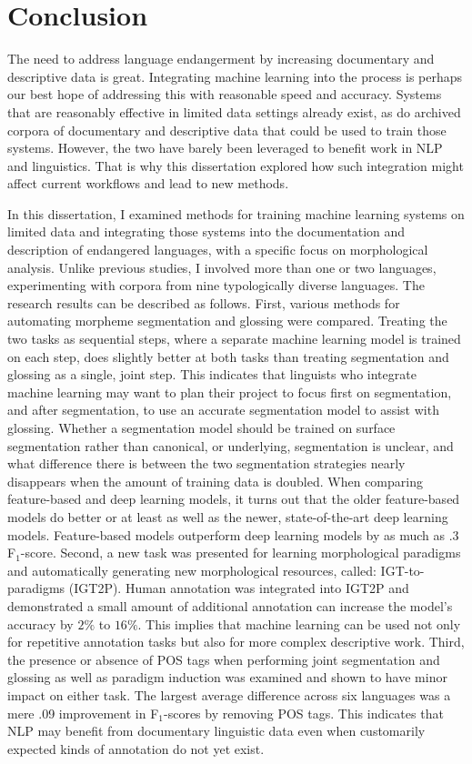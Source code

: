\chapter{Conclusion}
\label{chap:conclusion}

The need to address language endangerment by increasing documentary and descriptive data is great. Integrating machine learning into the process is perhaps our best hope of addressing this with reasonable speed and accuracy. Systems that are reasonably effective in limited data settings already exist, as do archived corpora of documentary and descriptive data that could be used to train those systems. However, the two have barely been leveraged to benefit work in NLP and linguistics. That is why this dissertation explored how such integration might affect current workflows and lead to new methods. 

In this dissertation, I examined methods for training machine learning systems on limited data and integrating those systems into the documentation and description of endangered languages, with a specific focus on morphological analysis. Unlike previous studies, I involved more than one or two languages, experimenting with corpora from nine typologically diverse languages. The research results can be described as follows. First, various methods for automating morpheme segmentation and glossing were compared. Treating the two tasks as sequential steps, where a separate machine learning model is trained on each step, does slightly better at both tasks than treating segmentation and glossing as a single, joint step. This indicates that linguists who integrate machine learning may want to plan their project to focus first on segmentation, and after segmentation, to use an accurate segmentation model to assist with glossing. 
Whether a segmentation model should be trained on surface segmentation rather than canonical, or underlying, segmentation is unclear, and what difference there is between the two segmentation strategies nearly disappears when the amount of training data is doubled. 
When comparing feature-based and deep learning  models, it turns out that the older feature-based models do better or at least as well as the newer, state-of-the-art deep learning models. Feature-based models outperform deep learning models by as much as .3 F$_1$-score.
Second, a new task was presented for learning morphological paradigms and automatically generating new morphological resources, called: IGT-to-paradigms (IGT2P). Human annotation was integrated into IGT2P and demonstrated a small amount of additional annotation can increase the model's accuracy by $2\%$ to $16\%$. This implies that machine learning can be used not only for repetitive annotation tasks but also for more complex descriptive work. 
Third, the presence or absence of POS tags when performing joint segmentation and glossing as well as paradigm induction was examined and shown to have minor impact on either task. The largest average difference across six languages was a mere .09 improvement in F$_1$-scores by removing POS tags. This indicates that NLP may benefit from documentary linguistic data even when customarily expected kinds of annotation do not yet exist.

